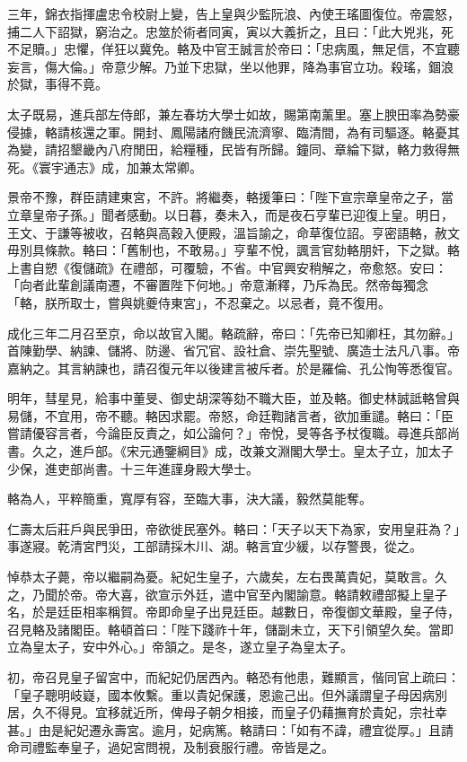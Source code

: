 \begin{pinyinscope}
三年，錦衣指揮盧忠令校尉上變，告上皇與少監阮浪、內使王瑤圖復位。帝震怒，捕二人下詔獄，窮治之。忠筮於術者同寅，寅以大義折之，且曰：「此大兇兆，死不足贖。」忠懼，佯狂以冀免。輅及中官王誠言於帝曰：「忠病風，無足信，不宜聽妄言，傷大倫。」帝意少解。乃並下忠獄，坐以他罪，降為事官立功。殺瑤，錮浪於獄，事得不竟。

太子既易，進兵部左侍郎，兼左春坊大學士如故，賜第南薰里。塞上腴田率為勢豪侵據，輅請核還之軍。開封、鳳陽諸府饑民流濟寧、臨清間，為有司驅逐。輅憂其為變，請招墾畿內八府閒田，給糧種，民皆有所歸。鐘同、章綸下獄，輅力救得無死。《寰宇通志》成，加兼太常卿。

景帝不豫，群臣請建東宮，不許。將繼奏，輅援筆曰：「陛下宣宗章皇帝之子，當立章皇帝子孫。」聞者感動。以日暮，奏未入，而是夜石亨輩已迎復上皇。明日，王文、于謙等被收，召輅與高穀入便殿，溫旨諭之，命草復位詔。亨密語輅，赦文毋別具條款。輅曰：「舊制也，不敢易。」亨輩不悅，諷言官劾輅朋奸，下之獄。輅上書自愬《復儲疏》在禮部，可覆驗，不省。中官興安稍解之，帝愈怒。安曰：「向者此輩創議南遷，不審置陛下何地。」帝意漸釋，乃斥為民。然帝每獨念「輅，朕所取士，嘗與姚夔侍東宮」，不忍棄之。以忌者，竟不復用。

成化三年二月召至京，命以故官入閣。輅疏辭，帝曰：「先帝已知卿枉，其勿辭。」首陳勤學、納諫、儲將、防邊、省冗官、設社倉、崇先聖號、廣造士法凡八事。帝嘉納之。其言納諫也，請召復元年以後建言被斥者。於是羅倫、孔公恂等悉復官。

明年，彗星見，給事中董旻、御史胡深等劾不職大臣，並及輅。御史林誠詆輅曾與易儲，不宜用，帝不聽。輅因求罷。帝怒，命廷鞫諸言者，欲加重譴。輅曰：「臣嘗請優容言者，今論臣反責之，如公論何？」帝悅，旻等各予杖復職。尋進兵部尚書。久之，進戶部。《宋元通鑒綱目》成，改兼文淵閣大學士。皇太子立，加太子少保，進吏部尚書。十三年進謹身殿大學士。

輅為人，平粹簡重，寬厚有容，至臨大事，決大議，毅然莫能奪。

仁壽太后莊戶與民爭田，帝欲徙民塞外。輅曰：「天子以天下為家，安用皇莊為？」事遂寢。乾清宮門災，工部請採木川、湖。輅言宜少緩，以存警畏，從之。

悼恭太子薨，帝以繼嗣為憂。紀妃生皇子，六歲矣，左右畏萬貴妃，莫敢言。久之，乃聞於帝。帝大喜，欲宣示外廷，遣中官至內閣諭意。輅請敕禮部擬上皇子名，於是廷臣相率稱賀。帝即命皇子出見廷臣。越數日，帝復御文華殿，皇子侍，召見輅及諸閣臣。輅頓首曰：「陛下踐祚十年，儲副未立，天下引領望久矣。當即立為皇太子，安中外心。」帝頷之。是冬，遂立皇子為皇太子。

初，帝召見皇子留宮中，而紀妃仍居西內。輅恐有他患，難顯言，偕同官上疏曰：「皇子聰明岐嶷，國本攸繫。重以貴妃保護，恩逾己出。但外議謂皇子母因病別居，久不得見。宜移就近所，俾母子朝夕相接，而皇子仍藉撫育於貴妃，宗社幸甚。」由是紀妃遷永壽宮。逾月，妃病篤。輅請曰：「如有不諱，禮宜從厚。」且請命司禮監奉皇子，過妃宮問視，及制衰服行禮。帝皆是之。


\end{pinyinscope}
